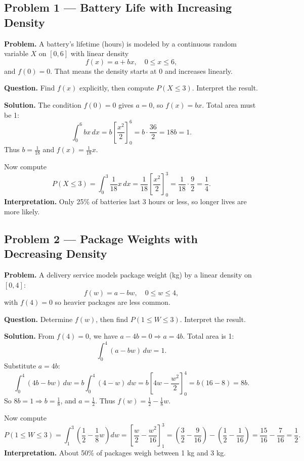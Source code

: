 	
	\begin{ExamProblems}
		
		\hypertarget{c3-ex1}{}
		\item
		\subsection*{Problem 1 — Battery Life with Increasing Density}
		
		\textbf{Problem.}
		A battery's lifetime (hours) is modeled by a continuous random variable \(X\) on \([0, 6]\) with
		linear density
		\[
		f(x)=a+bx,\quad 0\le x\le 6,
		\]
		and \(f(0)=0\). That means the density starts at 0 and increases linearly.
		
		\textbf{Question.} Find \(f(x)\) explicitly, then compute \(P(X\le 3)\). Interpret the result.
		
		\textbf{Solution.}
		The condition \(f(0)=0\) gives \(a=0\), so \(f(x)=bx\).
		Total area must be 1:
		\[
		\int_0^6 bx\,dx=b\left[\frac{x^2}{2}\right]_0^6=b\cdot\frac{36}{2}=18b=1.
		\]
		Thus \(b=\frac{1}{18}\) and \(f(x)=\frac{1}{18}x\).
		
		Now compute
		\[
		P(X\le 3)=\int_0^3 \frac{1}{18}x\,dx=\frac{1}{18}\left[\frac{x^2}{2}\right]_0^3=\frac{1}{18}\cdot\frac{9}{2}=\frac{1}{4}.
		\]
		\textbf{Interpretation.} Only 25\% of batteries last 3 hours or less, so longer lives are more likely.
		
		
		\hypertarget{c3-ex2}{}
		\item
		\subsection*{Problem 2 — Package Weights with Decreasing Density}
		
		\textbf{Problem.}
		A delivery service models package weight (kg) by a linear density on \([0, 4]\):
		\[
		f(w)=a-bw,\quad 0\le w\le 4,
		\]
		with \(f(4)=0\) so heavier packages are less common.
		
		\textbf{Question.} Determine \(f(w)\), then find \(P(1\le W\le 3)\). Interpret the result.
		
		\textbf{Solution.}
		From \(f(4)=0\), we have \(a-4b=0\Rightarrow a=4b\).
		Total area is 1:
		\[
		\int_0^4 (a-bw)\,dw=1.
		\]
		Substitute \(a=4b\):
		\[
		\int_0^4 (4b-bw)\,dw=b\int_0^4 (4-w)\,dw
		=b\left[4w-\frac{w^2}{2}\right]_0^4
		=b(16-8)=8b.
		\]
		So \(8b=1\Rightarrow b=\frac{1}{8}\), and \(a=\frac{1}{2}\).
		Thus \(f(w)=\frac{1}{2}-\frac{1}{8}w\).
		
		Now compute
		\[
		P(1\le W\le 3)=\int_1^3 \left(\frac{1}{2}-\frac{1}{8}w\right)dw
		=\left[\frac{w}{2}-\frac{w^2}{16}\right]_1^3
		=\left(\frac{3}{2}-\frac{9}{16}\right)-\left(\frac{1}{2}-\frac{1}{16}\right)
		=\frac{15}{16}-\frac{7}{16}=\frac{1}{2}.
		\]
		\textbf{Interpretation.} About 50\% of packages weigh between 1 kg and 3 kg.
		
	\end{ExamProblems}
	
